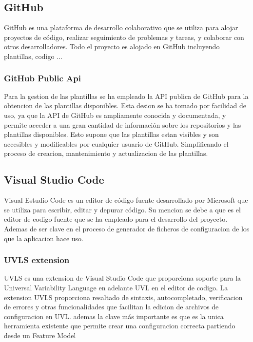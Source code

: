 \documentclass[12pt, a4paper, twoside]{article}
\begin{document}
\subsection{GitHub}
\cite{github}
GitHub es una plataforma de desarrollo colaborativo que se utiliza para alojar proyectos de código, realizar seguimiento de problemas y tareas, y colaborar con otros desarrolladores.
Todo el proyecto es alojado en GitHub incluyendo plantillas, codigo ...
\subsubsection{GitHub Public Api}
\cite{github_rest_api}
Para la gestion de las plantillas se ha empleado la API publica de GitHub para la obtencion de las plantillas disponibles.
Esta desion se ha tomado por facilidad de uso, ya que la API de GitHub es ampliamente conocida y documentada, y permite acceder a una gran cantidad de información sobre los repositorios y las plantillas disponibles.
Esto supone que las plantillas estan visibles y son accesibles y modificables por cualquier usuario de GitHub.
Simplificando el proceso de creacion, mantenimiento y actualizacion de las plantillas. 

\newpage

\subsection{Visual Studio Code}
\cite{vscode}
Visual Estudio Code es un editor de código fuente desarrollado por Microsoft que se utiliza para escribir, editar y depurar código.
Su mencion se debe a que es el editor de codigo fuente que se ha empleado para el desarrollo del proyecto. Ademas de ser clave en el proceso de generador de ficheros de configuracion
de los que la aplicacion hace uso.
\subsubsection{UVLS extension}
\cite{uvls_code}
UVLS es una extension de Visual Studio Code que proporciona soporte para la Universal Variability Language en adelante UVL en el editor de codigo.
La extension UVLS proporciona resaltado de sintaxis, autocompletado, verificacion de errores y otras funcionalidades que facilitan la edicion de archivos de configuracion en UVL.
ademas la clave más importante es que es la unica herramienta existente que permite crear una configuracion correcta partiendo desde un Feature Model
\end{document}

